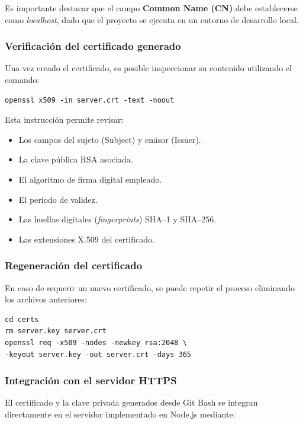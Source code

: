 Es importante destacar que el campo \textbf{Common Name (CN)} debe establecerse como \textit{localhost}, dado que el proyecto se ejecuta en un entorno de desarrollo local.

\subsubsection{Verificación del certificado generado}

Una vez creado el certificado, es posible inspeccionar su contenido utilizando el comando:

\begin{verbatim}
openssl x509 -in server.crt -text -noout
\end{verbatim}

Esta instrucción permite revisar:

\begin{itemize}
    \item Los campos del sujeto (Subject) y emisor (Issuer).
    \item La clave pública RSA asociada.
    \item El algoritmo de firma digital empleado.
    \item El período de validez.
    \item Las huellas digitales (\textit{fingerprints}) SHA--1 y SHA--256.
    \item Las extensiones X.509 del certificado.
\end{itemize}

\subsubsection{Regeneración del certificado}

En caso de requerir un nuevo certificado, se puede repetir el proceso eliminando los archivos anteriores:

\begin{verbatim}
cd certs
rm server.key server.crt
openssl req -x509 -nodes -newkey rsa:2048 \
-keyout server.key -out server.crt -days 365
\end{verbatim}

\subsubsection{Integración con el servidor HTTPS}

El certificado y la clave privada generados desde Git Bash se integran directamente en el servidor implementado en Node.js mediante:

